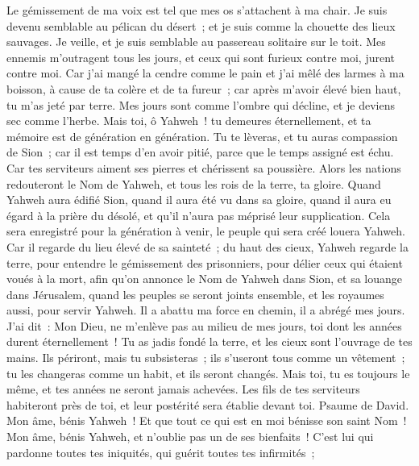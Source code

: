 \begin{multicols}{2}
Le gémissement de ma voix est tel que mes os s'attachent à ma chair.
Je suis devenu semblable au pélican du désert~; et je suis comme la chouette des lieux sauvages.
Je veille, et je suis semblable au passereau solitaire sur le toit.
Mes ennemis m'outragent tous les jours, et ceux qui sont furieux contre moi, jurent contre moi.
Car j'ai mangé la cendre comme le pain et j'ai mêlé des larmes à ma boisson,
à cause de ta colère et de ta fureur~; car après m'avoir élevé bien haut, tu m'as jeté par terre.
Mes jours sont comme l'ombre qui décline, et je deviens sec comme l'herbe.
Mais toi, ô Yahweh~! tu demeures éternellement, et ta mémoire est de génération en génération.
Tu te lèveras, et tu auras compassion de Sion~; car il est temps d'en avoir pitié, parce que le temps assigné est échu.
Car tes serviteurs aiment ses pierres et chérissent sa poussière.
Alors les nations redouteront le Nom de Yahweh, et tous les rois de la terre, ta gloire.
Quand Yahweh aura édifié Sion, quand il aura été vu dans sa gloire,
quand il aura eu égard à la prière du désolé, et qu'il n'aura pas méprisé leur supplication.
Cela sera enregistré pour la génération à venir, le peuple qui sera créé louera Yahweh.
Car il regarde du lieu élevé de sa sainteté~; du haut des cieux, Yahweh regarde la terre,
pour entendre le gémissement des prisonniers, pour délier ceux qui étaient voués à la mort,
afin qu'on annonce le Nom de Yahweh dans Sion, et sa louange dans Jérusalem,
quand les peuples se seront joints ensemble, et les royaumes aussi, pour servir Yahweh.
Il a abattu ma force en chemin, il a abrégé mes jours.
J'ai dit~: Mon Dieu, ne m'enlève pas au milieu de mes jours, toi dont les années durent éternellement~!
Tu as jadis fondé la terre, et les cieux sont l'ouvrage de tes mains.
Ils périront, mais tu subsisteras~; ils s'useront tous comme un vêtement~; tu les changeras comme un habit, et ils seront changés.
Mais toi, tu es toujours le même, et tes années ne seront jamais achevées.
Les fils de tes serviteurs habiteront près de toi, et leur postérité sera établie devant toi.
\VerseOne{}Psaume de David. Mon âme, bénis Yahweh~! Et que tout ce qui est en moi bénisse son saint Nom~!
Mon âme, bénis Yahweh, et n'oublie pas un de ses bienfaits~!
C'est lui qui pardonne toutes tes iniquités, qui guérit toutes tes infirmités~;

\end{multicols}
